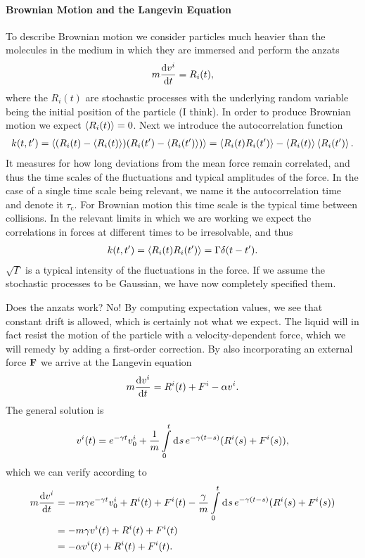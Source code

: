 \paragraph{Brownian Motion and the Langevin Equation}
To describe Brownian motion we consider particles much heavier than the molecules in the medium in which they are immersed and perform the anzats
\begin{align*}
	m\dv{v^{i}}{t} = R_{i}(t),
\end{align*}
where the $R_{i}(t)$ are stochastic processes with the underlying random variable being the initial position of the particle (I think). In order to produce Brownian motion we expect $\expval{R_{i}(t)} = 0$. Next we introduce the autocorrelation function
\begin{align*}
	k(t, t^{\prime}) = \expval{(R_{i}(t) - \expval{R_{i}(t)})(R_{i}(t\ensuremath{^{\prime}}) - \expval{R_{i}(t\ensuremath{^{\prime}})})} = \expval{R_{i}(t)R_{i}(t\ensuremath{^{\prime}})} - \expval{R_{i}(t)}\expval{R_{i}(t\ensuremath{^{\prime}})}.
\end{align*}
It measures for how long deviations from the mean force remain correlated, and thus the time scales of the fluctuations and typical amplitudes of the force. In the case of a single time scale being relevant, we name it the autocorrelation time and denote it $\tau_{\text{c}}$. For Brownian motion this time scale is the typical time between collisions. In the relevant limits in which we are working we expect the correlations in forces at different times to be irresolvable, and thus
\begin{align*}
	k(t, t^{\prime}) = \expval{R_{i}(t)R_{i}(t\ensuremath{^{\prime}})} = \Gamma\delta(t - t^{\prime}).
\end{align*}
$\sqrt{\Gamma}$ is a typical intensity of the fluctuations in the force. If we assume the stochastic processes to be Gaussian, we have now completely specified them.

Does the anzats work? No! By computing expectation values, we see that constant drift is allowed, which is certainly not what we expect. The liquid will in fact resist the motion of the particle with a velocity-dependent force, which we will remedy by adding a first-order correction. By also incorporating an external force $\vb{F}$ we arrive at the Langevin equation
\begin{align*}
	m\dv{v^{i}}{t} = R^{i}(t) + F^{i} - \alpha v^{i}.
\end{align*}
The general solution is
\begin{align*}
	v^{i}(t) = e^{-\gamma t}v^{i}_{0} + \frac{1}{m}\int\limits_{0}^{t}\dd[]{s}e^{-\gamma(t - s)}(R^{i}(s) + F^{i}(s)),
\end{align*}
which we can verify according to
\begin{align*}
	m\dv{v^{i}}{t} &= -m\gamma e^{-\gamma t}v^{i}_{0} + R^{i}(t) + F^{i}(t) - \frac{\gamma}{m}\int\limits_{0}^{t}\dd[]{s}e^{-\gamma(t - s)}(R^{i}(s) + F^{i}(s)) \\
	               &= -m\gamma v^{i}(t) + R^{i}(t) + F^{i}(t) \\
	               &= -\alpha v^{i}(t) + R^{i}(t) + F^{i}(t).
\end{align*}

